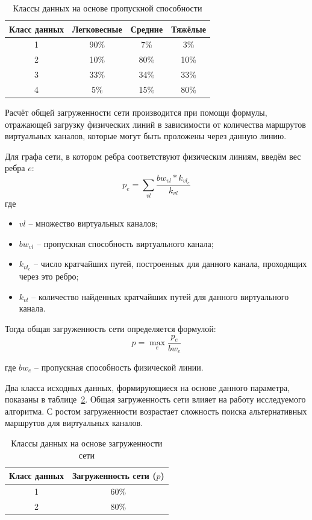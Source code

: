 \documentclass[12pt, a4paper]{article}
\begin{document}
\begin{table}[h]
	\caption{Классы данных на основе пропускной способности}
	\label{table:bwclass}
\begin{center}
\begin{tabular}{|c|c|c|c|}
\hline
	 Класс данных& Легковесные & Средние & Тяжёлые\\
\hline
	1 & 90\% & 7\% & 3\% \\
\hline
 2 & 10\% & 80\% & 10\% \\
\hline
	3 & 33\% & 34\% & 33\% \\
\hline
	4 & 5\% & 15\% & 80\% \\
\hline
\end{tabular}
\end{center}
\end{table}

Расчёт общей загруженности сети производится при помощи формулы, отражающей загрузку физических линий в зависимости от количества маршрутов виртуальных каналов, которые могут быть проложены через данную линию.

Для графа сети, в котором ребра соответствуют физическим линиям, введём вес ребра $e$:
$$p_{e} = \sum_{vl}\frac{bw_{vl} \ast k_{vl_e}}{k_{vl}}$$
где 
\begin{itemize}
	\item $vl$ -- множество виртуальных каналов;
	\item $bw_{vl}$ -- пропускная способность виртуального канала;
	\item $k_{vl_e}$ -- число кратчайших путей, построенных для данного канала, проходящих через это ребро;
	\item $k_{vl}$ -- количество найденных кратчайших путей для данного виртуального канала.
\end{itemize}

Тогда общая загруженность сети определяется формулой:
$$p = \max_{e}\frac{p_{e}}{bw_{e}}$$

где $bw_{e}$ -- пропускная способность физической линии.

Два класса исходных данных, формирующиеся на основе данного параметра, показаны в таблице~\ref{table:loadclass}. Общая загруженность сети влияет на работу исследуемого алгоритма. С ростом загруженности возрастает сложность поиска альтернативных маршрутов для виртуальных каналов. 

\begin{table}[h]
	\caption{Классы данных на основе загруженности сети}
	\label{table:loadclass}
\begin{center}
\begin{tabular}{|c|c|}
\hline
	Класс данных & Загруженность сети ($p$)\\
\hline
	1 & 60\% \\
\hline
	2 & 80\% \\
\hline
\end{tabular}
\end{center}
\end{table}
\end{document}
